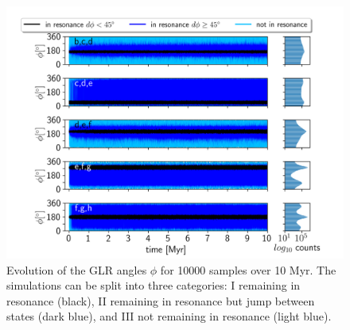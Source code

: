 \documentclass[twocolumn]{aastex63}
\begin{document}


\begin{figure}
    \centering
    \includegraphics[width =\hsize]{figures/tlM.png}
    \caption{Evolution of the GLR angles $\phi$ for 10000 samples over 10 Myr. The simulations can be split into three categories: I remaining in resonance (black), II remaining in resonance but jump between states (dark blue), and III not remaining in resonance (light blue).}
    \label{fig:tlM}
\end{figure}
\end{document}
